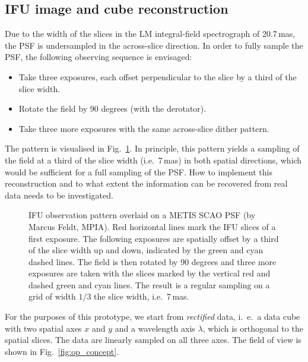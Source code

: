 \subsection{IFU image and cube reconstruction}
\label{ssec:criticalifuimageandcubereconstruction}
\label{ssec:image_reconstruction}

Due to the width of the slices in the LM integral-field spectrograph
of 20.7\,mas, the PSF is undersampled in the across-slice direction.
In order to fully sample the PSF, the following observing sequence is envisaged:
\begin{itemize}
    \item Take three exposures, each offset perpendicular to the slice by a third of the slice width.
    \item Rotate the field by 90 degrees (with the derotator).
    \item Take three more exposures with the same across-slice dither pattern.
\end{itemize}

The pattern is visualised in Fig.~\ref{fig:ifu_pattern}. In principle,
this pattern yields a sampling of the field at a third of the slice
width (i.e.~7\,mas) in both spatial directions, which would be
sufficient for a full sampling of the PSF. How to implement this
reconstruction and to what extent the information can be recovered
from real data needs to be investigated.

\begin{figure}[hb]
  \centering
  \caption[IFU dithering and rotation pattern]{%
    IFU observation pattern overlaid on a METIS SCAO PSF (by Marcus
    Feldt, MPIA). Red horizontal lines mark the IFU slices of a first
    exposure. The following exposures are spatially offset by a third
    of the slice width up and down, indicated by the green and cyan
    dashed lines. The field is then rotated by 90 degrees and three
    more exposures are taken with the slices marked by the vertical
    red and dashed green and cyan lines. The result is a regular
    sampling on a grid of width $1/3$ the slice width, i.e.~7\,mas.}
  \label{fig:ifu_pattern}
\end{figure}

For the purposes of this prototype, we start from \emph{rectified} data,
i.~e.~a data cube with two spatial axes $x$ and $y$ and a wavelength axis $\lambda$,
which is orthogonal to the spatial slices. The data are linearly sampled on all three axes.
The field of view is shown in Fig.~\ref{fig:op_concept}.

